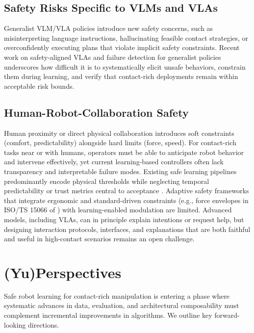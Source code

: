\documentclass[Afour,sageh,times]{template/sagej}
\newcommand{\suggest}[1]{{\color{olive} (#1)}}
\begin{document}
    \subsection{Safety Risks Specific to VLMs and VLAs}
    Generalist VLM/VLA policies introduce new safety concerns, such as misinterpreting language instructions, hallucinating feasible contact strategies, or overconfidently executing plans that violate implicit safety constraints. Recent work on safety-aligned VLAs and failure detection for generalist policies underscores how difficult it is to systematically elicit unsafe behaviors, constrain them during learning, and verify that contact-rich deployments remain within acceptable risk bounds.
     
    \subsection{Human-Robot-Collaboration Safety}
    Human proximity or direct physical collaboration introduces soft constraints (comfort, predictability) alongside hard limits (force, speed). For contact-rich tasks near or with humans, operators must be able to anticipate robot behavior and intervene effectively, yet current learning-based controllers often lack transparency and interpretable failure modes. Existing safe learning pipelines predominantly encode physical thresholds while neglecting temporal predictability or trust metrics central to acceptance \citep{346,253,hanna2020towards}. Adaptive safety frameworks that integrate ergonomic and standard-driven constraints (e.g., force envelopes in ISO/TS 15066 of \cite{ISO15066}) with learning-enabled modulation are limited.
     Advanced models, including VLAs, can in principle explain intentions or request help, but designing interaction protocols, interfaces, and explanations that are both faithful and useful in high-contact scenarios remains an open challenge.
    
    
    
    \section{\suggest{Yu}Perspectives}\label{sec:perspectives}
    Safe robot learning for contact-rich manipulation is entering a phase where systematic advances in data, evaluation, and architectural composability must complement incremental improvements in algorithms. We outline key forward-looking directions.
\end{document}

